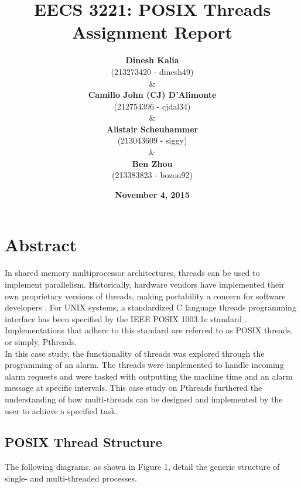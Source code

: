 \documentclass[11pt]{article}
\newcommand{\forceindent}{\leavevmode{\parindent=1em\indent}}
\begin{document}
\title{\textbf{EECS 3221: POSIX Threads Assignment Report}}
\author{\textbf{Dinesh Kalia}\\ (213273420 - dinesh49) \\
\& \\
\textbf{Camillo John (CJ) D'Alimonte}\\ (212754396 - cjdal34) \\
\& \\
\textbf{Alistair Scheuhammer}\\ (213043609 - siggy) \\
\& \\
\textbf{Ben Zhou}\\ (213383823 - bozon92)}
\date {\textbf{November 4, 2015}}
\maketitle

\tableofcontents

\section{Abstract}
\forceindent In shared memory multiprocessor architectures, threads can be used to implement parallelism. Historically, hardware vendors have implemented their own proprietary versions of threads, making portability a concern for software developers \cite{Barney}. For UNIX systems, a standardized C language threads programming interface has been specified by the IEEE POSIX 1003.1c standard \cite{Barney}. Implementations that adhere to this standard are referred to as POSIX threads, or simply, Pthreads. \\
\forceindent In this case study, the functionality of threads was explored through the programming of an alarm. The threads were implemented to handle incoming alarm requests and were tasked with outputting the machine time and an alarm message at specific intervals. This case study on Pthreads furthered the understanding of how multi-threads can be designed and implemented by the user to achieve a specified task.  
	\subsection{POSIX Thread Structure} 
\forceindent The following diagrams, as shown in Figure 1, detail the generic structure of single- and multi-threaded processes.\\	 
\begin{figure}[h!]
\centering
{}
    \hspace{3cm}
\caption{}
\end{figure}
\end{document}
